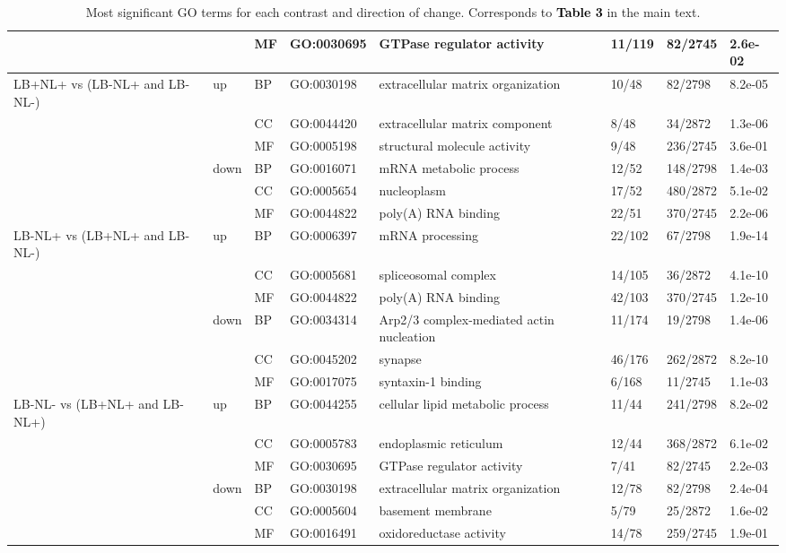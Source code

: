 \documentclass[11pt]{article}\usepackage[]{graphicx}\usepackage[usenames,dvipsnames]{color}
\begin{document}
\begin{table}[ht]
\begin{tabular}{llllp{}lll}
   &  & MF & GO:0030695 & GTPase regulator activity & 11/119 & 82/2745 & 2.6e-02 \\ 
   \midrule
LB+NL+ vs (LB-NL+ and LB-NL-) & up & BP & GO:0030198 & extracellular matrix organization & 10/48 & 82/2798 & 8.2e-05 \\ 
   &  & CC & GO:0044420 & extracellular matrix component & 8/48 & 34/2872 & 1.3e-06 \\ 
   &  & MF & GO:0005198 & structural molecule activity & 9/48 & 236/2745 & 3.6e-01 \\ 
   & down & BP & GO:0016071 & mRNA metabolic process & 12/52 & 148/2798 & 1.4e-03 \\ 
   &  & CC & GO:0005654 & nucleoplasm & 17/52 & 480/2872 & 5.1e-02 \\ 
   &  & MF & GO:0044822 & poly(A) RNA binding & 22/51 & 370/2745 & 2.2e-06 \\ 
   \midrule
LB-NL+ vs (LB+NL+ and LB-NL-) & up & BP & GO:0006397 & mRNA processing & 22/102 & 67/2798 & 1.9e-14 \\ 
   &  & CC & GO:0005681 & spliceosomal complex & 14/105 & 36/2872 & 4.1e-10 \\ 
   &  & MF & GO:0044822 & poly(A) RNA binding & 42/103 & 370/2745 & 1.2e-10 \\ 
   & down & BP & GO:0034314 & Arp2/3 complex-mediated actin nucleation & 11/174 & 19/2798 & 1.4e-06 \\ 
   &  & CC & GO:0045202 & synapse & 46/176 & 262/2872 & 8.2e-10 \\ 
   &  & MF & GO:0017075 & syntaxin-1 binding & 6/168 & 11/2745 & 1.1e-03 \\ 
   \midrule
LB-NL- vs (LB+NL+ and LB-NL+) & up & BP & GO:0044255 & cellular lipid metabolic process & 11/44 & 241/2798 & 8.2e-02 \\ 
   &  & CC & GO:0005783 & endoplasmic reticulum & 12/44 & 368/2872 & 6.1e-02 \\ 
   &  & MF & GO:0030695 & GTPase regulator activity & 7/41 & 82/2745 & 2.2e-03 \\ 
   & down & BP & GO:0030198 & extracellular matrix organization & 12/78 & 82/2798 & 2.4e-04 \\ 
   &  & CC & GO:0005604 & basement membrane & 5/79 & 25/2872 & 1.6e-02 \\ 
   &  & MF & GO:0016491 & oxidoreductase activity & 14/78 & 259/2745 & 1.9e-01 \\ 
   \bottomrule
\end{tabular}
\endgroup
\caption{{\color{darkgray} Most significant GO terms 
for each contrast and direction of change. Corresponds to 
\textcolor{black}{\colorbox{highlighter}{\textbf{Table 3}}} in the main text.}} 
\end{table}
\end{document}
